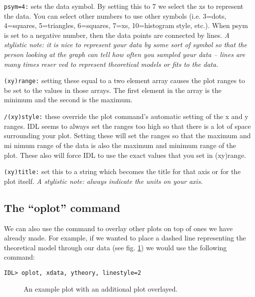 \verb&psym=4:& sets the data symbol.  By setting this to 7 we select the
xs to represent the data.  You can select other numbers to use other
symbols (i.e.  3=dots, 4=squares, 5=triangles, 6=squares, 7=xs,
10=histogram style, etc.).  When psym is set to a negative number, then
the data points are connected by lines.  \emph{A stylistic note: it is
nice to represent your data by some sort of symbol so that the person
looking at the graph can tell how often you sampled your data -- lines
are many times reser ved to represent theoretical models or fits to the
data.}

\verb&(xy)range:& setting these equal to a two element array causes the
plot ranges to be set to the values in those arrays.  The first element
in the array is the minimum and the second is the maximum. 

\verb&/(xy)style:& these override the plot command's automatic setting
of the x and y ranges.  IDL seems to always set the ranges too high so
that there is a lot of space surrounding your plot.  Setting these will
set the ranges so that the maximum and mi nimum range of the data is
also the maximum and minimum range of the plot.  These also will force
IDL to use the exact values that you set in (xy)range. 

\verb&(xy)title:& set this to a string which becomes the title for that
axis or for the plot itself.  \emph{A stylistic note: always indicate
the units on your axis.}

\subsection{The ``oplot'' command}\label{oplot}

	We can also use the \oplot command to overlay other plots on top
of ones we have already made.  For example, if we wanted to place a
dashed line representing the theoretical model through our data (see
fig.  \ref{ex2}) we would use the following command:

\begin{verbatim}
IDL> oplot, xdata, ytheory, linestyle=2
\end{verbatim}

\begin{figure}[!ht]
\begin{center}
\leavevmode
{}
\end{center}
\caption{An example plot with an additional plot overlayed.}\label{ex2}
\end{figure}

